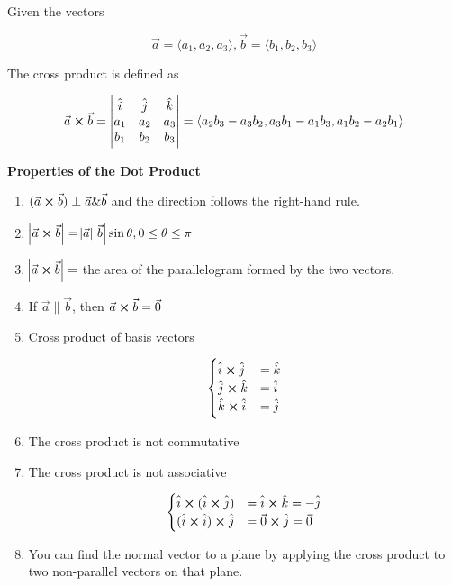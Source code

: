 \begin{definition}
	Given the vectors

	\begin{equation}
		\vec a = \langle a_1, a_2, a_3 \rangle, \vec b = \langle b_1, b_2, b_3 \rangle
	\end{equation}

	The cross product is defined as

	\begin{equation}
		\vec a \cross \vec b = \begin{vmatrix}
			\hat i & \hat j & \hat k\\
			a_1 & a_2 & a_3\\
			b_1 & b_2 & b_3
		\end{vmatrix} = \langle a_2 b_3 - a_3 b_2, a_3 b_1 - a_1 b_3, a_1 b_2 - a_2 b_1 \rangle
	\end{equation}
\end{definition}

\textbf{Properties of the Dot Product}

\begin{enumerate}[1.]
	\item $(\vec a \cross \vec b) \perp \vec a \& \vec b$ and the direction follows the right-hand rule.
	\item $\abs{\vec a \cross \vec b} = \abs{\vec a} \abs{\vec b} \sin\theta, 0 \leq \theta \leq \pi$
	\item $\abs{\vec a \cross \vec b} = $ the area of the parallelogram formed by the two vectors.
	\item If $\vec a \parallel \vec b$, then $\vec a \cross \vec b = \vec 0$
	\item Cross product of basis vectors
	
	\begin{equation}
		\begin{cases}
			\hat i \cross \hat j &= \hat k\\
			\hat j \cross \hat k &= \hat i\\
			\hat k \cross \hat i &= \hat j
		\end{cases}
	\end{equation}

	\item The cross product is not commutative
	\item The cross product is not associative

	\begin{example}
		\begin{equation}
			\begin{cases}
				\hat i \cross (\hat i \cross \hat j) &= \hat i \cross \hat k = -\hat j\\
				(\hat i \cross \hat i) \cross \hat j &= \vec 0 \cross \hat j = \vec 0
			\end{cases}
		\end{equation}
	\end{example}

	\item You can find the normal vector to a plane by applying the cross product to two non-parallel vectors on that plane.
\end{enumerate}

